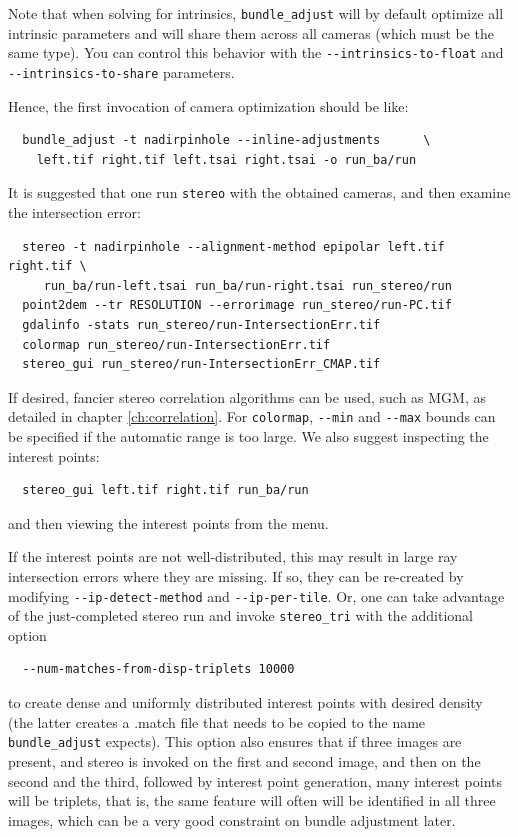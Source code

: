 Note that when solving for intrinsics, \texttt{bundle\_adjust} will by default
optimize all intrinsic parameters and will share them across all cameras (which must
be the same type).  You can control this behavior with the 
\texttt{-\/-intrinsics-to-float} and \texttt{-\/-intrinsics-to-share} parameters.

Hence, the first invocation of camera optimization should be like:

\begin{verbatim}
  bundle_adjust -t nadirpinhole --inline-adjustments      \
    left.tif right.tif left.tsai right.tsai -o run_ba/run
\end{verbatim}

It is suggested that one run \texttt{stereo} with the obtained cameras, 
and then examine the intersection error:

\begin{verbatim}
  stereo -t nadirpinhole --alignment-method epipolar left.tif right.tif \
     run_ba/run-left.tsai run_ba/run-right.tsai run_stereo/run 
  point2dem --tr RESOLUTION --errorimage run_stereo/run-PC.tif
  gdalinfo -stats run_stereo/run-IntersectionErr.tif
  colormap run_stereo/run-IntersectionErr.tif
  stereo_gui run_stereo/run-IntersectionErr_CMAP.tif
\end{verbatim}

If desired, fancier stereo correlation algorithms can be used, such as MGM, as detailed in  
chapter \ref{ch:correlation}. For \texttt{colormap}, \texttt{-\/-min} and \texttt{-\/-max} 
bounds can be specified if the automatic range is too large. We also suggest inspecting
the interest points:
\begin{verbatim}
  stereo_gui left.tif right.tif run_ba/run
\end{verbatim}
and then viewing the interest points from the menu. 

If the interest points are not well-distributed, this may result in large ray intersection errors
where they are missing. If so, they can be re-created by modifying \texttt{-\/-ip-detect-method}
and \texttt{-\/-ip-per-tile}. Or, one can take advantage of the just-completed stereo run
and invoke \texttt{stereo\_tri} with the additional option 
\begin{verbatim} 
  --num-matches-from-disp-triplets 10000
\end{verbatim}

to create dense and uniformly distributed interest points with desired density
(the latter creates a .match file that needs to be copied to the name
\texttt{bundle\_adjust} expects). This option also ensures that if three
images are present, and stereo is invoked on the first and second image,
and then on the second and the third, followed by interest point generation,
many interest points will be triplets, that is, the same feature will often
will be identified in all three images, which
can be a very good constraint on bundle adjustment later.

